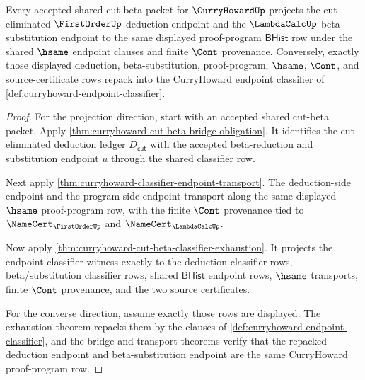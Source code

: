 \begin{theorem}
\label{thm:curryhoward-cut-beta-endpoint-exactness}
Every accepted shared cut-beta packet for $\CurryHowardUp$ projects the
cut-eliminated $\FirstOrderUp$ deduction endpoint and the $\LambdaCalcUp$
beta-substitution endpoint to the same displayed proof-program $\mathsf{BHist}$
row under the shared $\hsame$ endpoint clauses and finite $\Cont$ provenance.
Conversely, exactly those displayed deduction, beta-substitution,
proof-program, $\hsame$, $\Cont$, and source-certificate rows repack into the
CurryHoward endpoint classifier of \autoref{def:curryhoward-endpoint-classifier}.
\end{theorem}
\begin{proof}
For the projection direction, start with an accepted shared cut-beta packet.
Apply \autoref{thm:curryhoward-cut-beta-bridge-obligation}. It identifies the
cut-eliminated deduction ledger $D_{\mathsf{cut}}$ with the accepted
beta-reduction and substitution endpoint $u$ through the shared classifier row.

Next apply \autoref{thm:curryhoward-classifier-endpoint-transport}. The
deduction-side endpoint and the program-side endpoint transport along the same
displayed $\hsame$ proof-program row, with the finite $\Cont$ provenance tied to
$\NameCert_{\FirstOrderUp}$ and $\NameCert_{\LambdaCalcUp}$.

Now apply \autoref{thm:curryhoward-cut-beta-classifier-exhaustion}. It projects
the endpoint classifier witness exactly to the deduction classifier rows,
beta/substitution classifier rows, shared $\mathsf{BHist}$ endpoint rows,
$\hsame$ transports, finite $\Cont$ provenance, and the two source certificates.

For the converse direction, assume exactly those rows are displayed. The
exhaustion theorem repacks them by the clauses of
\autoref{def:curryhoward-endpoint-classifier}, and the bridge and transport
theorems verify that the repacked deduction endpoint and beta-substitution
endpoint are the same CurryHoward proof-program row.
\end{proof}

